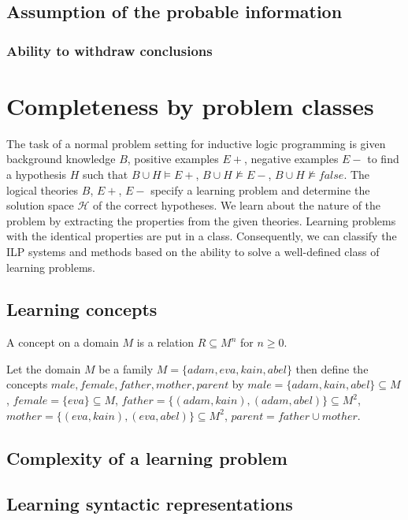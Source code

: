 \subsection{Assumption of the probable information}

\subsubsection{Ability to withdraw conclusions}


\section{Completeness by problem classes}
The task of a normal problem setting for inductive logic programming is given background knowledge $B$, positive examples $E+$, negative examples $E-$ to find a hypothesis $H$ such that $B \cup H \models E+$,
$B \cup H \not\models E-$,
$B \cup H \not\models false$.
The logical theories $B$, $E+$, $E-$ specify a learning problem and determine the solution space $\mathcal{H}$ of the correct hypotheses. We learn about the nature of the problem by extracting the properties from the given theories. Learning problems with the identical properties are put in a class. Consequently, we can classify the ILP systems and methods based on the ability to solve a well-defined class of learning problems.

\subsection{Learning concepts}
\begin{defn}
A concept on a domain $M$ is a relation $R \subseteq M^n$ for $n \ge 0$.
\end{defn}
\begin{exmp}
Let the domain $M$ be a family $M=\{adam, eva, kain, abel\}$ then define the concepts $male, female, father, mother, parent$ by
$male=\{adam, kain, abel\}\subseteq{M}$,
$female=\{eva\}\subseteq{M}$,
$father=\{(adam,kain), (adam,abel)\}\subseteq{M^2}$,
$mother=\{(eva,kain), (eva,abel)\}\subseteq{M^2}$,
$parent=father \cup mother$.
\end{exmp}
\subsection{Complexity of a learning problem}
\subsection{Learning syntactic representations}
